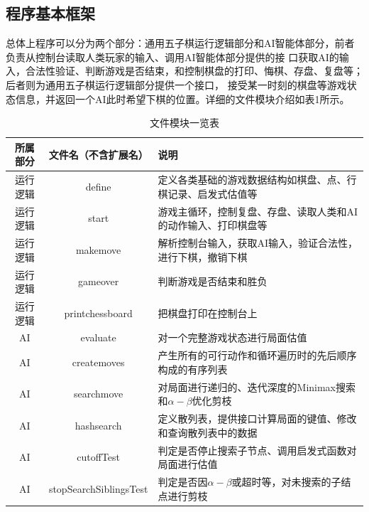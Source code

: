 \documentclass{acm_proc_article-sp}
\begin{document}
\subsection{\textbf{程序基本框架}}
总体上程序可以分为两个部分：通用五子棋运行逻辑部分和AI智能体部分，前者负责从控制台读取人类玩家的输入、调用AI智能体部分提供的接
口获取AI的输入，合法性验证、判断游戏是否结束，和控制棋盘的打印、悔棋、存盘、复盘等；后者则为通用五子棋运行逻辑部分提供一个接口，
接受某一时刻的棋盘等游戏状态信息，并返回一个AI此时希望下棋的位置。详细的文件模块介绍如表1所示。\\
\begin{table}
       \centering
       \caption{文件模块一览表}
       \begin{tabular}{|c|c|l|} \hline
       所属部分 & 文件名（不含扩展名） & 说明\\ \hline
       运行逻辑 & define & 定义各类基础的游戏数据结构如棋盘、点、行棋记录、启发式估值等\\ \hline
       运行逻辑 & start & 游戏主循环，控制复盘、存盘、读取人类和AI的动作输入、打印棋盘等\\ \hline
       运行逻辑 & makemove & 解析控制台输入，获取AI输入，验证合法性，进行下棋，撤销下棋\\ \hline
       运行逻辑 & gameover & 判断游戏是否结束和胜负\\ \hline
       运行逻辑 & printchessboard & 把棋盘打印在控制台上\\ \hline
       AI & evaluate & 对一个完整游戏状态进行局面估值\\ \hline
       AI & createmoves & 产生所有的可行动作和循环遍历时的先后顺序构成的有序列表\\ \hline
       AI & searchmove & 对局面进行递归的、迭代深度的Minimax搜索和$\alpha-\beta$优化剪枝\\ \hline
       AI & hashsearch & 定义散列表，提供接口计算局面的键值、修改和查询散列表中的数据\\ \hline
       AI & cutoffTest & 判定是否停止搜索子节点、调用启发式函数对局面进行估值\\ \hline
       AI & stopSearchSiblingsTest & 判定是否因$\alpha-\beta$或超时等，对未搜索的子结点进行剪枝\\ \hline
       \end{tabular}
\end{table}
\end{document}
